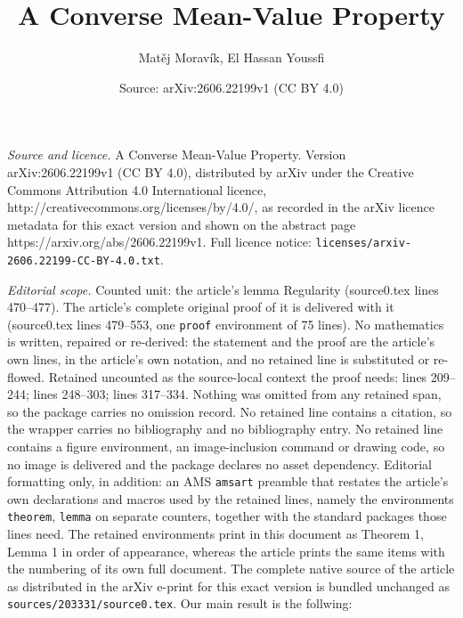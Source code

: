\documentclass[10pt,a4paper]{amsart}
\title{A Converse Mean-Value Property}
\author{Mat\v{e}j Morav\'ik, El Hassan Youssfi}
\date{Source: arXiv:2606.22199v1 (CC BY 4.0)}
\begin{document}
\maketitle

\noindent\emph{Source and licence.} A Converse Mean-Value Property. Version arXiv:2606.22199v1 (CC BY 4.0), distributed by arXiv under the Creative Commons Attribution 4.0 International licence, http://creativecommons.org/licenses/by/4.0/, as recorded in the arXiv licence metadata for this exact version and shown on the abstract page https://arxiv.org/abs/2606.22199v1. Full licence notice: \texttt{licenses/arxiv-2606.22199-CC-BY-4.0.txt}.\par\smallskip

\noindent\textit{Editorial scope.} Counted unit: the article's lemma Regularity (source0.tex lines 470--477). The article's complete original proof of it is delivered with it (source0.tex lines 479--553, one \texttt{proof} environment of 75 lines). No mathematics is written, repaired or re-derived: the statement and the proof are the article's own lines, in the article's own notation, and no retained line is substituted or re-flowed.  Retained uncounted as the source-local context the proof needs: lines 209--244; lines 248--303; lines 317--334.  Nothing was omitted from any retained span, so the package carries no omission record.  No retained line contains a citation, so the wrapper carries no bibliography and no bibliography entry.  No retained line contains a figure environment, an image-inclusion command or drawing code, so no image is delivered and the package declares no asset dependency.  Editorial formatting only, in addition: an AMS \texttt{amsart} preamble that restates the article's own declarations and macros used by the retained lines, namely the environments \texttt{theorem}, \texttt{lemma} on separate counters, together with the standard packages those lines need.  The retained environments print in this document as Theorem 1, Lemma 1 in order of appearance, whereas the article prints the same items with the numbering of its own full document.  The complete native source of the article as distributed in the arXiv e-print for this exact version is bundled unchanged as \texttt{sources/203331/source0.tex}.
 Our main result is the follwing:
\end{document}
